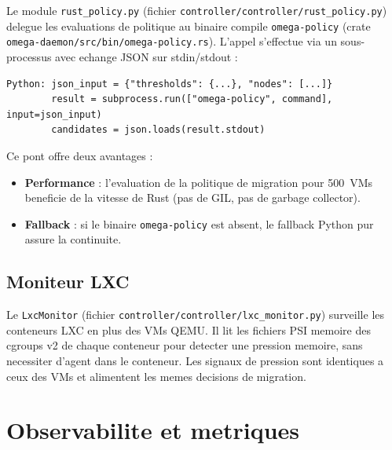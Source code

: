 Le module \texttt{rust\_policy.py} (fichier \texttt{controller/controller/rust\_policy.py}) delegue les evaluations de politique au binaire compile \texttt{omega-policy} (crate \texttt{omega-daemon/src/bin/omega-policy.rs}). L'appel s'effectue via un sous-processus avec echange JSON sur stdin/stdout :

\begin{verbatim}
Python: json_input = {"thresholds": {...}, "nodes": [...]}
        result = subprocess.run(["omega-policy", command], input=json_input)
        candidates = json.loads(result.stdout)
\end{verbatim}

Ce pont offre deux avantages :

\begin{itemize}
    \item \textbf{Performance} : l'evaluation de la politique de migration pour 500~VMs beneficie de la vitesse de Rust (pas de GIL, pas de garbage collector).
    \item \textbf{Fallback} : si le binaire \texttt{omega-policy} est absent, le fallback Python pur assure la continuite.
\end{itemize}

\subsection{Moniteur LXC}
\label{subsec:moniteur-lxc}

Le \texttt{LxcMonitor} (fichier \texttt{controller/controller/lxc\_monitor.py}) surveille les conteneurs LXC en plus des VMs QEMU. Il lit les fichiers PSI memoire des cgroups v2 de chaque conteneur pour detecter une pression memoire, sans necessiter d'agent dans le conteneur. Les signaux de pression sont identiques a ceux des VMs et alimentent les memes decisions de migration.

\section{Observabilite et metriques}
\label{sec:observabilite}

